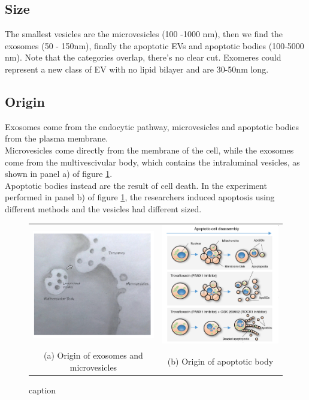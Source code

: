 \subsection{Size}
The smallest vesicles are the microvesicles (100 -1000 nm), then we find the exosomes (50 - 150nm), finally the apoptotic EVs and apoptotic bodies (100-5000 nm). Note that the categories overlap, there's no clear cut. Exomeres could represent a new class of EV with no lipid bilayer and are 30-50nm long.

\subsection{Origin}
Exosomes come from the endocytic pathway, microvesicles and apoptotic bodies from the plasma membrane.
\\
Microvesicles come directly from the membrane of the cell, while the exosomes come from the multivescivular body, which contains the intraluminal vesicles, as shown in panel a) of figure \ref{fig:origin}.
\\
Apoptotic bodies instead are the result of cell death. In the experiment performed in panel b) of figure \ref{fig:origin}, the researchers induced apoptosis using different methods and the vesicles had different sized.

\begin{figure}
\begin{tabular}{cc}
  \includegraphics[width=65mm]{origin1} &   \includegraphics[width=65mm]{origin2} \\
(a) Origin of exosomes and microvesicles & (b) Origin of apoptotic body \\[6pt]

\end{tabular}
\caption{caption}
\label{fig:origin}
\end{figure}

